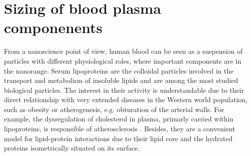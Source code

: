 



\section{Sizing of blood plasma componenents}
\label{sec:lipoprotein_continuous}

From a nanoscience point of view, human blood can be seen as a suspension of particles with different physiological roles, where important components are in the nanorange. Serum lipoproteins are the colloidal particles involved in the transport and metabolism of insoluble lipids and are among the most studied biological particles. The interest in their activity is understandable due to their direct relationship with very extended diseases in the Western world population, such as obesity or atherogenesis, e.g. obturation of the arterial walls. For example, the dysregulation of cholesterol in plasma, primarly carried within lipoproteins, is responsible of atherosclerosis \citep{munro_pathogenesis_1988}. Besides, they are a convenient model for lipid-protein interactions \citep{assmann_lipid-protein_1974} due to their lipid core and the hydrated proteins isometrically situated on its surface.

